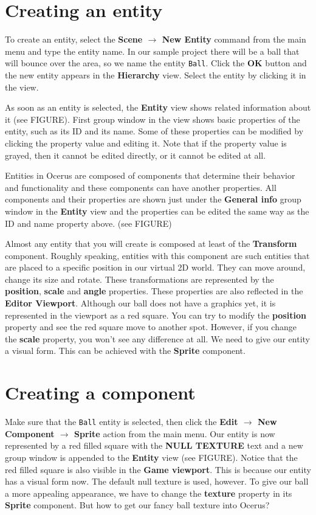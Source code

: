 \documentclass[a4paper,12pt]{article}
\begin{document}
\section{Creating an entity}
To create an entity, select the \textbf{Scene $\to$ New Entity} command from the main menu and type the entity name. In our sample project there will be a ball that will bounce over the area, so we name the entity \texttt{Ball}. Click the \textbf{OK} button and the new entity appears in the \textbf{Hierarchy} view. Select the entity by clicking it in the view.

As soon as an entity is selected, the \textbf{Entity} view shows related information about it (see FIGURE). First group window in the view shows basic properties of the entity, such as its ID and its name. Some of these properties can be modified by clicking the property value and editing it. Note that if the property value is grayed, then it cannot be edited directly, or it cannot be edited at all.

Entities in Ocerus are composed of components that determine their behavior and functionality and these components can have another properties. All components and their properties are shown just under the \textbf{General info} group window in the \textbf{Entity} view and the properties can be edited the same way as the ID and name property above. (see FIGURE)

Almost any entity that you will create is composed at least of the \textbf{Transform} component. Roughly speaking, entities with this component are such entities that are placed to a specific position in our virtual 2D world. They can move around, change its size and rotate. These transformations are represented by the \textbf{position}, \textbf{scale} and \textbf{angle} properties. These properties are also reflected in the \textbf{Editor Viewport}. Although our ball does not have a graphics yet, it is represented in the viewport as a red square. You can try to modify the \textbf{position} property and see the red square move to another spot. However, if you change the \textbf{scale} property, you won't see any difference at all. We need to give our entity a visual form. This can be achieved with the \textbf{Sprite} component.

\section{Creating a component}
Make sure that the \texttt{Ball} entity is selected, then click the \textbf{Edit $\to$ New Component $\to$ Sprite} action from the main menu. Our entity is now represented by a red filled square with the \textbf{NULL TEXTURE} text and a new group window is appended to the \textbf{Entity} view (see FIGURE). Notice that the red filled square is also visible in the \textbf{Game viewport}. This is because our entity has a visual form now. The default null texture is used, however. To give our ball a more appealing appearance, we have to change the \textbf{texture} property in its \textbf{Sprite} component. But how to get our fancy ball texture into Ocerus?
\end{document}
